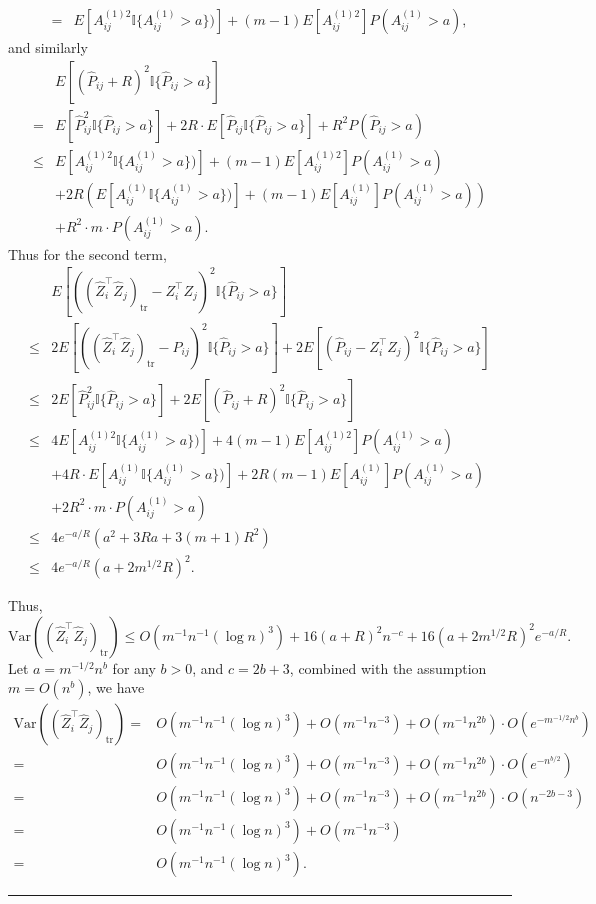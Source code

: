 \documentclass[a4paper]{article}
\newenvironment{proof}{{\bf Proof:  }}{\hfill\rule{2mm}{2mm}}
\renewcommand{\hat}{\widehat}
\begin{document}
\begin{proof}
\begin{align*}
	= & E[A_{ij}^{(1)2} \mathbb{I} \{ A_{ij}^{(1)} > a \})] + (m-1) E[A_{ij}^{(1)2}] P(A_{ij}^{(1)} > a),
\end{align*}
and similarly
\begin{align*}
	& E[(\hat{P}_{ij} + R)^2 \mathbb{I} \{ \hat{P}_{ij} > a \}] \\
	= & E[\hat{P}_{ij}^2 \mathbb{I} \{ \hat{P}_{ij} > a \}] + 2R \cdot E[\hat{P}_{ij} \mathbb{I} \{ \hat{P}_{ij} > a \}] + R^2 P(\hat{P}_{ij} > a) \\
	\le & E[A_{ij}^{(1)2} \mathbb{I} \{ A_{ij}^{(1)} > a \})] + (m-1) E[A_{ij}^{(1)2}] P(A_{ij}^{(1)} > a) \\
	& + 2R \left( E[A_{ij}^{(1)} \mathbb{I} \{ A_{ij}^{(1)} > a \})] + (m-1) E[A_{ij}^{(1)}] P(A_{ij}^{(1)} > a) \right) \\
	& + R^2 \cdot m \cdot P(A_{ij}^{(1)} > a).
\end{align*}
Thus for the second term,
\begin{align*}
	& E[((\hat{Z}_i^{\top} \hat{Z}_j)_{\mathrm{tr}} - Z_i^{\top} Z_j)^2 \mathbb{I}\{\hat{P}_{ij} > a\}] \\
	\le & 2 E[((\hat{Z}_i^{\top} \hat{Z}_j)_{\mathrm{tr}} - \hat{P}_{ij})^2 \mathbb{I}\{\hat{P}_{ij} > a\}] + 2 E[(\hat{P}_{ij} - Z_i^{\top} Z_j)^2 \mathbb{I}\{\hat{P}_{ij} > a\}] \\
	\le & 2 E[\hat{P}_{ij}^2 \mathbb{I}\{\hat{P}_{ij} > a\}] + 2 E[(\hat{P}_{ij} + R)^2 \mathbb{I}\{\hat{P}_{ij} > a\}] \\
	\le & 4 E[A_{ij}^{(1)2} \mathbb{I} \{ A_{ij}^{(1)} > a \})] + 4(m-1) E[A_{ij}^{(1)2}] P(A_{ij}^{(1)} > a) \\
	& + 4R \cdot E[A_{ij}^{(1)} \mathbb{I} \{ A_{ij}^{(1)} > a \})] + 2R(m-1) E[A_{ij}^{(1)}] P(A_{ij}^{(1)} > a) \\
	& + 2R^2 \cdot m \cdot P(A_{ij}^{(1)} > a) \\
	\le & 4 e^{-a/R} \left( a^2 + 3R a + 3(m+1)R^2 \right) \\
	\le & 4 e^{-a/R} (a + 2 m^{1/2} R)^2.
\end{align*}

Thus,
\[
	\mathrm{Var}((\hat{Z}_i^{\top} \hat{Z}_j)_{\mathrm{tr}}) \le
	O(m^{-1} n^{-1} (\log n)^3) + 16 (a+R)^2 n^{-c} + 16 (a+2 m^{1/2} R)^2 e^{-a/R}.
\]
Let $a = m^{-1/2} n^{b}$ for any $b > 0$, and $c = 2b + 3$, combined with the assumption $m = O(n^{b})$, we have
\begin{align*}
	\mathrm{Var}((\hat{Z}_i^{\top} \hat{Z}_j)_{\mathrm{tr}})
	= & O(m^{-1} n^{-1} (\log n)^3) + O(m^{-1} n^{-3}) + O(m^{-1} n^{2b}) \cdot O(e^{-m^{-1/2} n^{b}}) \\
	= & O(m^{-1} n^{-1} (\log n)^3) + O(m^{-1} n^{-3}) + O(m^{-1} n^{2b}) \cdot O(e^{- n^{b/2}}) \\
	= & O(m^{-1} n^{-1} (\log n)^3) + O(m^{-1} n^{-3}) + O(m^{-1} n^{2b}) \cdot O(n^{-2b-3}) \\
	= & O(m^{-1} n^{-1} (\log n)^3) + O(m^{-1} n^{-3}) \\
	= & O(m^{-1} n^{-1} (\log n)^3).
\end{align*}
\end{proof}
\end{document}

